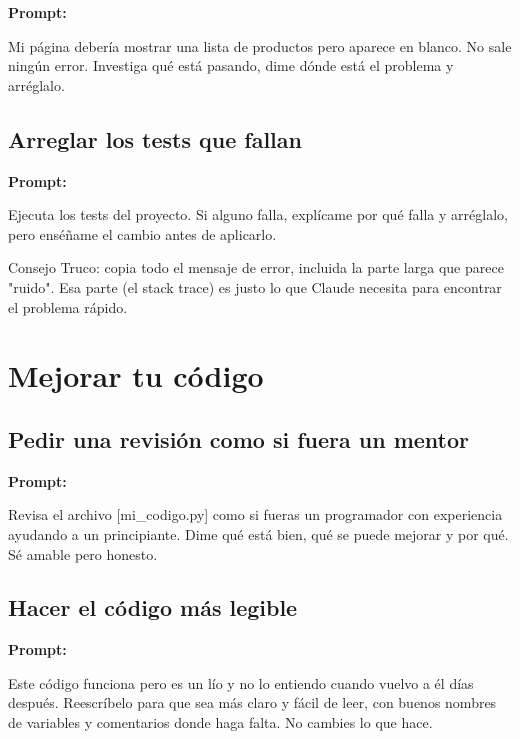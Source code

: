 \documentclass[11pt,a4paper]{report}
\begin{document}
\noindent\textbf{Prompt: }
\begin{codebox}
Mi página debería mostrar una lista de productos pero aparece en blanco. No sale ningún error. Investiga qué está pasando, dime dónde está el problema y arréglalo.
\end{codebox}

\subsection{Arreglar los tests que fallan}

\noindent\textbf{Prompt: }
\begin{codebox}
Ejecuta los tests del proyecto. Si alguno falla, explícame por qué falla y arréglalo, pero enséñame el cambio antes de aplicarlo.
\end{codebox}

\begin{calloutbox}{Consejo}
Truco: copia todo el mensaje de error, incluida la parte larga que parece "ruido". Esa parte (el stack trace) es justo lo que Claude necesita para encontrar el problema rápido.\end{calloutbox}

\section{ Mejorar tu código}

\subsection{Pedir una revisión como si fuera un mentor}

\noindent\textbf{Prompt: }
\begin{codebox}
Revisa el archivo [mi_codigo.py] como si fueras un programador con experiencia ayudando a un principiante. Dime qué está bien, qué se puede mejorar y por qué. Sé amable pero honesto.
\end{codebox}

\subsection{Hacer el código más legible}

\noindent\textbf{Prompt: }
\begin{codebox}
Este código funciona pero es un lío y no lo entiendo cuando vuelvo a él días después. Reescríbelo para que sea más claro y fácil de leer, con buenos nombres de variables y comentarios donde haga falta. No cambies lo que hace.
\end{codebox}
\end{document}
